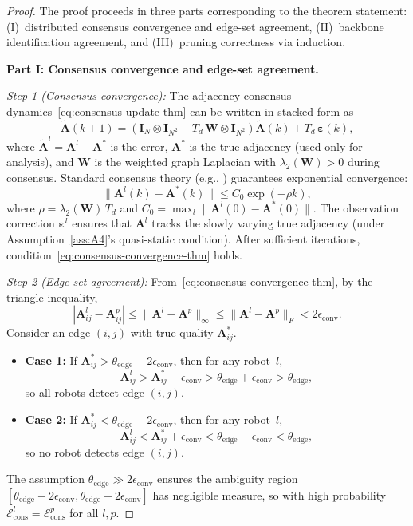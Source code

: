 \begin{proof}
The proof proceeds in three parts corresponding to the theorem statement: (I)~distributed consensus convergence and edge-set agreement, (II)~backbone identification agreement, and (III)~pruning correctness via induction.

\medskip
\noindent\textbf{Part I: Consensus convergence and edge-set agreement.}

\emph{Step 1 (Consensus convergence):}
The adjacency-consensus dynamics~\eqref{eq:consensus-update-thm} can be written in stacked form as
\[
\tilde{\mathbf{A}}(k+1) = (\mathbf{I}_N\otimes\mathbf{I}_{N^2} - T_d\,\mathbf{W}\otimes\mathbf{I}_{N^2})\tilde{\mathbf{A}}(k) + T_d\,\boldsymbol{\varepsilon}(k),
\]
where $\tilde{\mathbf{A}}^l=\mathbf{A}^l-\mathbf{A}^*$ is the error, $\mathbf{A}^*$ is the true adjacency (used only for analysis), and $\mathbf{W}$ is the weighted graph Laplacian with $\lambda_2(\mathbf{W})>0$ during consensus.
Standard consensus theory (e.g., \cite{olfati-saber2007}) guarantees exponential convergence:
\[
\|\mathbf{A}^l(k)-\mathbf{A}^*(k)\| \le C_0\exp(-\rho k),
\]
where $\rho=\lambda_2(\mathbf{W})\,T_d$ and $C_0=\max_l\|\mathbf{A}^l(0)-\mathbf{A}^*(0)\|$.
The observation correction $\boldsymbol{\varepsilon}^l$ ensures that $\mathbf{A}^l$ tracks the slowly varying true adjacency (under Assumption~\ref{ass:A4}'s quasi-static condition).
After sufficient iterations, condition~\eqref{eq:consensus-convergence-thm} holds.

\emph{Step 2 (Edge-set agreement):}
From~\eqref{eq:consensus-convergence-thm}, by the triangle inequality,
\[
|\mathbf{A}^l_{ij}-\mathbf{A}^p_{ij}| \le \|\mathbf{A}^l-\mathbf{A}^p\|_{\infty} \le \|\mathbf{A}^l-\mathbf{A}^p\|_F < 2\epsilon_{\mathrm{conv}}.
\]
Consider an edge $(i,j)$ with true quality $\mathbf{A}^*_{ij}$.
\begin{itemize}
\item \textbf{Case 1:} If $\mathbf{A}^*_{ij}>\theta_{\mathrm{edge}}+2\epsilon_{\mathrm{conv}}$, then for any robot~$l$,
\[
\mathbf{A}^l_{ij} > \mathbf{A}^*_{ij}-\epsilon_{\mathrm{conv}} > \theta_{\mathrm{edge}}+\epsilon_{\mathrm{conv}} > \theta_{\mathrm{edge}},
\]
so all robots detect edge $(i,j)$.

\item \textbf{Case 2:} If $\mathbf{A}^*_{ij}<\theta_{\mathrm{edge}}-2\epsilon_{\mathrm{conv}}$, then for any robot~$l$,
\[
\mathbf{A}^l_{ij} < \mathbf{A}^*_{ij}+\epsilon_{\mathrm{conv}} < \theta_{\mathrm{edge}}-\epsilon_{\mathrm{conv}} < \theta_{\mathrm{edge}},
\]
so no robot detects edge $(i,j)$.
\end{itemize}
The assumption $\theta_{\mathrm{edge}}\gg 2\epsilon_{\mathrm{conv}}$ ensures the ambiguity region $[\theta_{\mathrm{edge}}-2\epsilon_{\mathrm{conv}},\theta_{\mathrm{edge}}+2\epsilon_{\mathrm{conv}}]$ has negligible measure, so with high probability $\mathcal{E}^l_{\mathrm{cons}}=\mathcal{E}^p_{\mathrm{cons}}$ for all $l,p$.


\end{proof}
